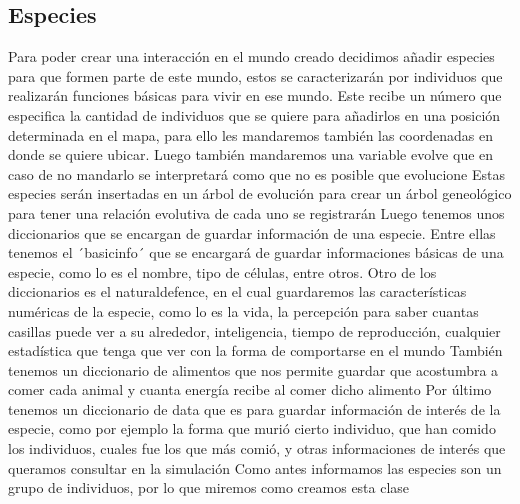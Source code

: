 \documentclass{llncs}
\begin{document}
\subsection{Especies}
Para poder crear una interacción en el mundo creado decidimos añadir especies para que formen parte de este mundo, estos se caracterizarán por individuos que realizarán funciones básicas para vivir en ese mundo.
\newline
\newline
Este recibe un número que especifica la cantidad de individuos que se quiere para añadirlos en una posición determinada en el mapa, para ello les mandaremos también las coordenadas en donde se quiere ubicar. Luego también mandaremos una variable evolve que en caso de no mandarlo se interpretará como que no es posible que evolucione
\newline
\newline
Estas especies serán insertadas en un árbol de evolución para crear un árbol geneológico para tener una relación evolutiva de cada uno se registrarán
\newline
\newline
Luego tenemos unos diccionarios que se encargan de guardar información de una especie. Entre ellas tenemos el ´basicinfo´ que se encargará de guardar informaciones básicas de una especie, como lo es el nombre, tipo de células, entre otros.
\newline
\newline
Otro de los diccionarios es el naturaldefence, en el cual guardaremos las características numéricas de la especie, como lo es la vida, la percepción para saber cuantas casillas puede ver a su alrededor, inteligencia, tiempo de reproducción, cualquier estadística que tenga que ver con la forma de comportarse en el mundo
\newline
\newline
También tenemos un diccionario de alimentos que nos permite guardar que acostumbra a comer cada animal y cuanta energía recibe al comer dicho alimento
\newline
\newline
Por último tenemos un diccionario de data que es para guardar información de interés de la especie, como por ejemplo la forma que murió cierto individuo, que han comido los individuos, cuales fue los que más comió, y otras informaciones de interés que queramos consultar en la simulación
\newline
\newline
Como antes informamos las especies son un grupo de individuos, por lo que miremos como creamos esta clase
\end{document}
